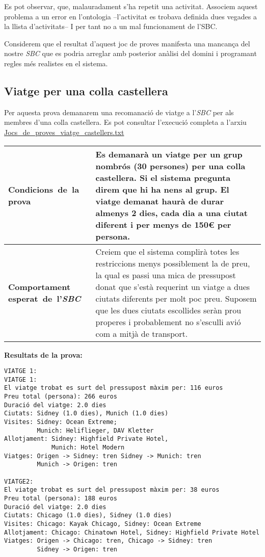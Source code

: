 \documentclass[11pt,a4paper]{article}
\begin{document}
Es pot observar, que, malauradament s'ha repetit una activitat. Associem aquest problema a un error en l'ontologia --l'activitat es trobava definida dues vegades a la llista d'activitats-- I per tant no a un mal funcionament de l'SBC.

Considerem que el resultat d'aquest joc de proves manifesta una mancança del nostre \emph{SBC} que es podria arreglar amb posterior anàlisi del domini i programant regles més realistes en el sistema.

\subsection{Viatge per una colla castellera}
Per aquesta prova demanarem una recomanació de viatge a l'\emph{SBC} per als membres d'una colla castellera. Es pot consultar l'execució completa a l'arxiu \url{Jocs_de_proves_viatge_castellers.txt} \\

\noindent
\begin{tabular}{|p{}|p{}|}
\hline
\textbf{\mbox{Condicions de la} \mbox{prova}} & Es demanarà un viatge per un grup nombrós (30 persones) per una colla castellera. Si el sistema pregunta direm que hi ha nens al grup. El viatge demanat haurà de durar almenys 2 dies, cada dia a una ciutat diferent i per menys de 150\euro{} per persona.\\
\hline
\textbf{Comportament \mbox{esperat de l'\emph{SBC}}} & Creiem que el sistema complirà totes les restriccions menys possiblement la de preu, la qual es passi una mica de pressupost donat que s'està requerint un viatge a dues ciutats diferents per molt poc preu. Suposem que les dues ciutats escollides seràn prou properes i probablement no s'esculli avió com a mitjà de transport. \\
\hline
\end{tabular} 
\bigskip

\textbf{Resultats de la prova:} 
\begin{lstlisting}VIATGE 1:
VIATGE 1:
El viatge trobat es surt del pressupost màxim per: 116 euros 
Preu total (persona): 266 euros 
Duració del viatge: 2.0 dies 
Ciutats: Sidney (1.0 dies), Munich (1.0 dies) 
Visites: Sidney: Ocean Extreme;
         Munich: Heliflieger, DAV Kletter 
Allotjament: Sidney: Highfield Private Hotel,
             Munich: Hotel Modern 
Viatges: Origen -> Sidney: tren Sidney -> Munich: tren
         Munich -> Origen: tren 

VIATGE2:
El viatge trobat es surt del pressupost màxim per: 38 euros 
Preu total (persona): 188 euros 
Duració del viatge: 2.0 dies 
Ciutats: Chicago (1.0 dies), Sidney (1.0 dies) 
Visites: Chicago: Kayak Chicago, Sidney: Ocean Extreme 
Allotjament: Chicago: Chinatown Hotel, Sidney: Highfield Private Hotel 
Viatges: Origen -> Chicago: tren, Chicago -> Sidney: tren
         Sidney -> Origen: tren
\end{lstlisting} 
\end{document}

